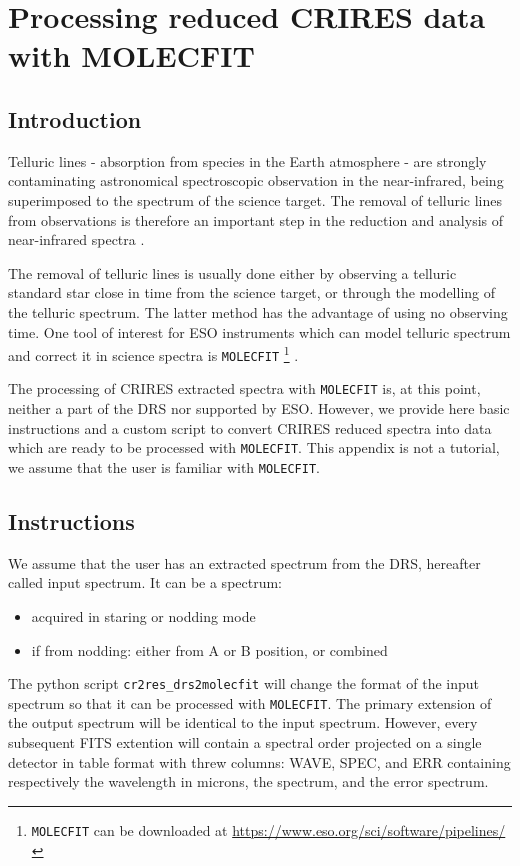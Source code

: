 \section{Processing reduced CRIRES data with MOLECFIT}
\label{sec:molecfit}


\subsection{Introduction}

Telluric lines - absorption from species in the Earth atmosphere - are strongly 
contaminating astronomical spectroscopic observation in the near-infrared, being
superimposed to the spectrum of the science target. The removal
of telluric lines from observations is therefore an important step in the reduction
and analysis of near-infrared spectra .

The removal of telluric lines is usually done either by observing a telluric standard star
close in time from the science target, or through the modelling of the telluric spectrum.
The latter method has the advantage of using no observing time. One tool of interest for 
ESO instruments which can model telluric spectrum and correct it in science spectra is {\tt MOLECFIT}
\footnote{{\tt MOLECFIT} can be downloaded at \url{https://www.eso.org/sci/software/pipelines/}} 
 \cite{smette-molecfit}.

The processing of CRIRES extracted spectra with {\tt MOLECFIT} is, at this point, neither
a part of the DRS nor supported by ESO. However, we provide here basic instructions and a custom script to convert
CRIRES reduced spectra into data which are ready to be processed with {\tt MOLECFIT}. This appendix
is not a tutorial, we assume that the user is familiar with {\tt MOLECFIT}. 

\subsection{Instructions}

We assume that the user has an extracted spectrum from the DRS, hereafter called input spectrum. It can be a spectrum:
\begin{itemize}
  \item acquired in staring or nodding mode
  \item  if from nodding: either from A or B position, or combined
\end{itemize}

The python script \verb!cr2res_drs2molecfit! will change the format of the input spectrum so that it can be processed with
{\tt MOLECFIT}. The primary extension of the output spectrum will be identical to the input spectrum. However,
every subsequent FITS extention will contain a spectral order projected on a single detector in table format with
threw columns: WAVE, SPEC, and ERR containing respectively the wavelength in microns, the spectrum, and the error spectrum.

